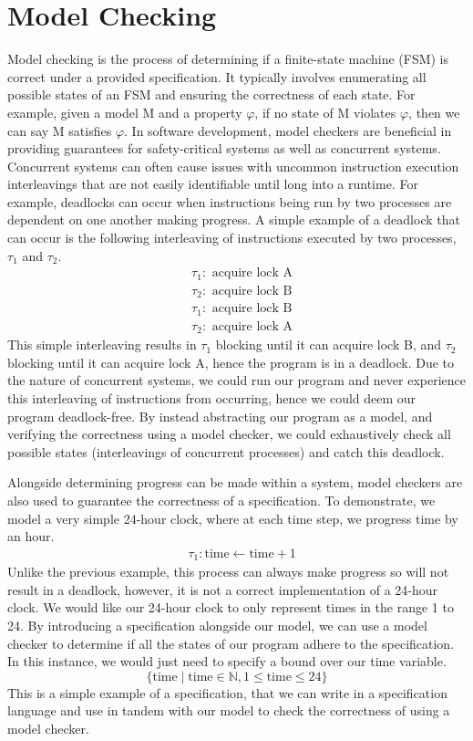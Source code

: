 \section{Model Checking}
Model checking is the process of determining if a finite-state machine (FSM) is correct under a provided specification. It typically involves enumerating all possible states of an FSM and ensuring the correctness of each state. For example, given a model M and a property $\varphi$, if no state of M violates $\varphi$, then we can say M satisfies $\varphi$. In software development, model checkers are beneficial in providing guarantees for safety-critical systems as well as concurrent systems. Concurrent systems can often cause issues with uncommon instruction execution interleavings that are not easily identifiable until long into a runtime. For example, deadlocks can occur when instructions being run by two processes are dependent on one another making progress. A simple example of a deadlock that can occur is the following interleaving of instructions executed by two processes, $\tau_1$ and $\tau_2$. 
\[
\begin{aligned}
& \tau_1: \text{ acquire lock A} \\
& \tau_2: \text{ acquire lock B} \\
& \tau_1: \text{ acquire lock B} \\
& \tau_2: \text{ acquire lock A}
\end{aligned}
\]
This simple interleaving results in $\tau_1$ blocking until it can acquire lock B, and $\tau_2$ blocking until it can acquire lock A, hence the program is in a deadlock. Due to the nature of concurrent systems, we could run our program and never experience this interleaving of instructions from occurring, hence we could deem our program deadlock-free. By instead abstracting our program as a model, and verifying the correctness using a model checker, we could exhaustively check all possible states (interleavings of concurrent processes) and catch this deadlock. 
\par
Alongside determining progress can be made within a system, model checkers are also used to guarantee the correctness of a specification. To demonstrate, we model a very simple 24-hour clock, where at each time step, we progress time by an hour.
\[
\begin{aligned}
& \tau_1: \text{time} \leftarrow \text{time} + 1
\end{aligned}
\]
Unlike the previous example, this process can always make progress so will not result in a deadlock, however, it is not a correct implementation of a 24-hour clock. We would like our 24-hour clock to only represent times in the range 1 to 24. By introducing a specification alongside our model, we can use a model checker to determine if all the states of our program adhere to the specification. In this instance, we would just need to specify a bound over our time variable.
\[
\{ \text{time} \mid \text{time} \in \mathbb{N}, 1 \leq \text{time} \leq 24 \}
\]
This is a simple example of a specification, that we can write in a specification language and use in tandem with our model to check the correctness of using a model checker.
